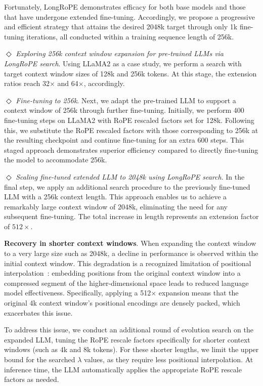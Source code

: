 Fortunately, LongRoPE demonstrates efficacy for both base models and those that have undergone extended fine-tuning. Accordingly, we propose a progressive and efficient strategy that attains the desired 2048k target through only 1k fine-tuning iterations, all conducted within a training sequence length of 256k.

$\Diamond$ \textit{Exploring 256k context window expansion for pre-trained LLMs via LongRoPE search}. Using LLaMA2 as a case study, we perform a search with target context window sizes of 128k and 256k tokens. At this stage, the extension ratios reach 32$\times$ and 64$\times$, accordingly.

$\Diamond$ \textit{Fine-tuning to 256k}. Next, we adapt the pre-trained LLM to support a context window of 256k through further fine-tuning. Initially, we perform 400 fine-tuning steps on LLaMA2 with RoPE rescaled factors set for 128k. Following this, we substitute the RoPE rescaled factors with those corresponding to 256k at the resulting checkpoint and continue fine-tuning for an extra 600 steps. This staged approach demonstrates superior efficiency compared to directly fine-tuning the model to accommodate 256k.

$\Diamond$ \textit{Scaling fine-tuned extended LLM to 2048k using LongRoPE search}. In the final step, we apply an additional search procedure to the previously fine-tuned LLM with a 256k context length. This approach enables us to achieve a remarkably large context window of 2048k, eliminating the need for any subsequent fine-tuning. The total increase in length represents an extension factor of $512\times$.

\textbf{Recovery in shorter context windows}. When expanding the context window to a very large size such as 2048k, a decline in performance is observed within the initial context window. This degradation is a recognized limitation of positional interpolation~\cite{pi}: embedding positions from the original context window into a compressed segment of the higher-dimensional space leads to reduced language model effectiveness. Specifically, applying a 512$\times$ expansion means that the original 4k context window's positional encodings are densely packed, which exacerbates this issue.

To address this issue, we conduct an additional round of evolution search on the expanded LLM, tuning the RoPE rescale factors specifically for shorter context windows (such as 4k and 8k tokens). For these shorter lengths, we limit the upper bound for the searched $\lambda$ values, as they require less positional interpolation. At inference time, the LLM automatically applies the appropriate RoPE rescale factors as needed.

